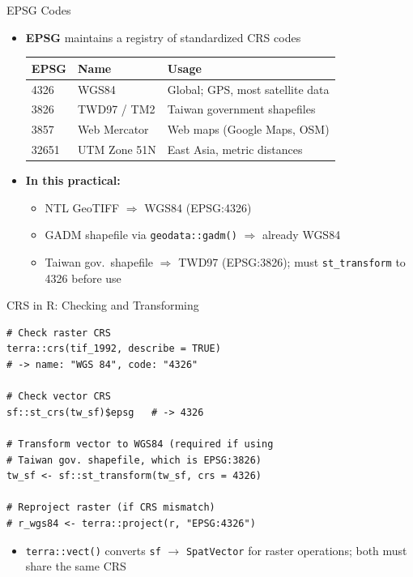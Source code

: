 \documentclass[dvipsnames,hyperref={pdfpagelabels=false}]{beamer}
\begin{document}
\begin{frame}{EPSG Codes}
\begin{itemize}
  \item \textbf{EPSG} maintains a registry of standardized CRS codes
  \vspace{0.3cm}
  \begin{center}
  \small
  \begin{tabular}{lll}
    \toprule
    \textbf{EPSG} & \textbf{Name} & \textbf{Usage} \\
    \midrule
    4326 & WGS84         & Global; GPS, most satellite data \\
    3826 & TWD97 / TM2   & Taiwan government shapefiles \\
    3857 & Web Mercator  & Web maps (Google Maps, OSM) \\
    32651 & UTM Zone 51N & East Asia, metric distances \\
    \bottomrule
  \end{tabular}
  \end{center}
  \vspace{0.3cm}
  \item \textbf{In this practical:}
  \vspace{0.15cm}
  \begin{itemize}
    \item NTL GeoTIFF $\Rightarrow$ WGS84 (EPSG:4326)
    \vspace{0.1cm}
    \item GADM shapefile via \texttt{geodata::gadm()}
          $\Rightarrow$ already WGS84
    \vspace{0.1cm}
    \item Taiwan gov.\ shapefile $\Rightarrow$ TWD97 (EPSG:3826);
          must \texttt{st\_transform} to 4326 before use
  \end{itemize}
\end{itemize}
\end{frame}


\begin{frame}[fragile]{CRS in R: Checking and Transforming}
\begin{lstlisting}
# Check raster CRS
terra::crs(tif_1992, describe = TRUE)
# -> name: "WGS 84", code: "4326"

# Check vector CRS
sf::st_crs(tw_sf)$epsg   # -> 4326

# Transform vector to WGS84 (required if using
# Taiwan gov. shapefile, which is EPSG:3826)
tw_sf <- sf::st_transform(tw_sf, crs = 4326)

# Reproject raster (if CRS mismatch)
# r_wgs84 <- terra::project(r, "EPSG:4326")
\end{lstlisting}
\begin{itemize}
  \item \texttt{terra::vect()} converts \texttt{sf} $\to$ \texttt{SpatVector}
        for raster operations; both must share the same CRS
\end{itemize}
\end{frame}
\end{document}
